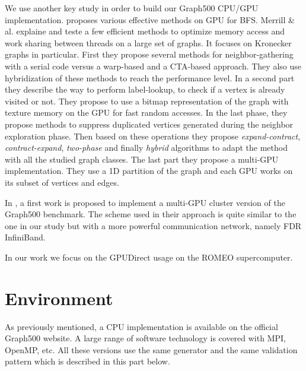 We use another key study in order to build our Graph500 CPU/GPU implementation. 
\cite{merrill2015high} proposes various effective methods on GPU for BFS. 
Merrill \& al. explaine and teste a few efficient methods to optimize memory access and work sharing between threads on a large set of graphs. 
It focuses on Kronecker graphs in particular. 
First they propose several methods for neighbor-gathering with a serial code versus a warp-based and a CTA-based approach. 
They also use hybridization of these methods to reach the performance level. 
In a second part they describe the way to perform label-lookup, to check if a vertex is already visited or not. 
They propose to use a bitmap representation of the graph with texture memory on the GPU for fast random accesses. 
In the last phase, they propose methods to suppress duplicated vertices generated during the neighbor exploration phase. 
Then based on these operations they propose \textit{expand-contract}, \textit{contract-expand}, \textit{two-phase} and finally \textit{hybrid} algorithms to adapt the method with all the studied graph classes.
The last part they propose a multi-GPU implementation.
They use a 1D partition of the graph and each GPU works on its subset of vertices and edges. 

In \cite{fu2014parallel}, a first work is proposed to implement a multi-GPU cluster version of the Graph500 benchmark. 
The scheme used in their approach is quite similar to the one in our study but with a more powerful communication network, namely FDR InfiniBand. 

In our work we focus on the GPUDirect usage on the ROMEO supercomputer. 

\section{Environment}
As previously mentioned, a CPU implementation is available on the official Graph500 website. 
A large range of software technology is covered with MPI, OpenMP, etc. 
All these versions use the same generator and the same validation pattern which is described in this part below. 

